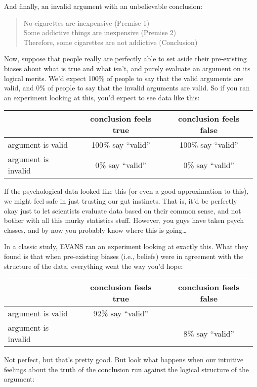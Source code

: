 \documentclass[]{book}
\begin{document}
And finally, an invalid argument with an unbelievable conclusion:

\begin{quote}
No cigarettes are inexpensive (Premise 1)\\
Some addictive things are inexpensive (Premise 2)\\
Therefore, some cigarettes are not addictive (Conclusion)
\end{quote}

Now, suppose that people really are perfectly able to set aside their pre-existing biases about what is true and what isn't, and purely evaluate an argument on its logical merits. We'd expect 100\% of people to say that the valid arguments are valid, and 0\% of people to say that the invalid arguments are valid. So if you ran an experiment looking at this, you'd expect to see data like this:

\begin{longtable}[]{@{}lcc@{}}
\toprule
& conclusion feels true & conclusion feels false\tabularnewline
\midrule
\endhead
argument is valid & 100\% say ``valid'' & 100\% say ``valid''\tabularnewline
argument is invalid & 0\% say ``valid'' & 0\% say ``valid''\tabularnewline
\bottomrule
\end{longtable}

If the psychological data looked like this (or even a good approximation to this), we might feel safe in just trusting our gut instincts. That is, it'd be perfectly okay just to let scientists evaluate data based on their common sense, and not bother with all this murky statistics stuff. However, you guys have taken psych classes, and by now you probably know where this is going\ldots{}

In a classic study, EVANS ran an experiment looking at exactly this. What they found is that when pre-existing biases (i.e., beliefs) were in agreement with the structure of the data, everything went the way you'd hope:

\begin{longtable}[]{@{}lcc@{}}
\toprule
& conclusion feels true & conclusion feels false\tabularnewline
\midrule
\endhead
argument is valid & 92\% say ``valid'' &\tabularnewline
argument is invalid & & 8\% say ``valid''\tabularnewline
\bottomrule
\end{longtable}

Not perfect, but that's pretty good. But look what happens when our intuitive feelings about the truth of the conclusion run against the logical structure of the argument:
\end{document}

